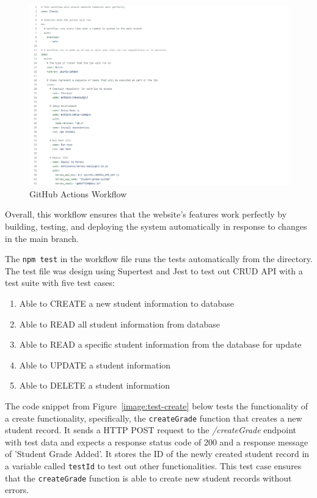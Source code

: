 \begin{figure}[h!]
    \centering
    \includegraphics[width=1.5\textwidth]{images/full-workflow.png}
    \caption{GitHub Actions Workflow}
    \label{image:full-workflow}
\end{figure}

Overall, this workflow ensures that the website's features work perfectly by building, testing, and deploying the system automatically in response to changes in the main branch.

The \texttt{npm test} in the workflow file runs the tests automatically from the directory. The test file was design using Supertest and Jest to test out CRUD API with a test suite with five test cases:

\begin{enumerate}
  \item Able to CREATE a new student information to database
  \item Able to READ all student information from database
  \item Able to READ a specific student information from the database for update
  \item Able to UPDATE a student information
  \item Able to DELETE a student information
\end{enumerate}

The code snippet from Figure~\ref{image:test-create} below tests the functionality of a create functionality, specifically, the \texttt{createGrade} function that creates a new student record. It sends a HTTP POST request to the \textit{/createGrade} endpoint with test data and expects a response status code of 200 and a response message of 'Student Grade Added'. It stores the ID of the newly created student record in a variable called \texttt{testId} to test out other functionalities. This test case ensures that the \texttt{createGrade} function is able to create new student records without errors.

